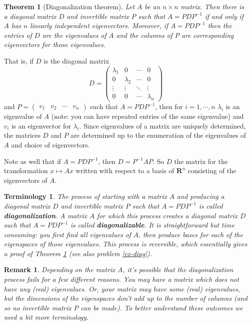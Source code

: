 \documentclass[12pt]{article}
\numberwithin{equation}{subsection}
\numberwithin{figure}{subsection}
\newtheorem{thm}[subsection]{Theorem}
\theoremstyle{note}
\newtheorem{remark}[subsection]{Remark}
\newtheorem{terminology}[subsection]{Terminology}
\newcommand{\R}{\mathbf{R}}
\begin{document}
\begin{thm}[Diagonalization theorem] \label{thm-diag}
	Let $A$ be an $n\times n$ matrix. Then there is a diagonal matrix $D$ and invertible matrix $P$ such that $A=PDP^{-1}$ if and only if $A$ has $n$ linearly independent eigenvectors. Moreover, if $A=PDP^{-1}$ then the entries of $D$ are the eigenvalues of $A$ and the columns of $P$ are corresponding eigenvectors for those eigenvalues. 
\end{thm}

That is, if $D$ is the diagonal matrix \[D=\begin{pmatrix} \lambda_1 & 0 & \cdots & 0 \\
0 & \lambda_2 & \cdots & 0 \\
\vdots & \vdots & \ddots & \vdots \\
0 & 0 & \cdots & \lambda_n \end{pmatrix}\]
and $P=\begin{pmatrix} v_1 & v_2 & \cdots & v_n \end{pmatrix}$ such that $A=PDP^{-1}$, then  for $i=1,\cdots,n$  $\lambda_i$ is an eigenvalue of $A$ (note: you can have repeated entries of the same eigenvalue) and $v_i$ is an eigenvector for $\lambda_i$. Since eigenvalues of a matrix are uniquely determined, the matrices $D$ and $P$ are determined up to the enumeration of the eigenvalues of $A$ and choice of eigenvectors. 

Note as well that if $A=PDP^{-1}$, then $D=P^{-1}AP$. So $D$ the matrix for the transformation $x\mapsto Ax$ written with respect to a basis of $\R^n$ consisting of the eigenvectors of $A$. 


\begin{terminology}The process of starting with a matrix $A$ and producing a diagonal matrix $D$ and invertible matrix $P$ such that $A=PDP^{-1}$ is called \textbf{diagonalization}. A matrix $A$ for which this process creates a diagonal matrix $D$ such that $A=PDP^{-1}$ is called \textbf{diagonalizable}. It is straightforward but time consuming: you first find all eigenvalues of $A$, then produce bases for each of the eigenspaces of those eigenvalues. This process is reversible, which essentially gives a proof of Theorem \ref{thm-diag} (see also problem \ref{ex-diag}).
\end{terminology}

\begin{remark}Depending on the matrix $A$, it's possible that the diagonalization process fails for a few different reasons. You may have a matrix which does not have any (real) eigenvalues. Or, your matrix may have some (real) eigenvalues, but  the dimensions of the eigenspaces don't add up to the number of columns (and so no invertible matrix $P$ can be made). To better understand these outcomes we need a bit more terminology.\end{remark}
\end{document}
